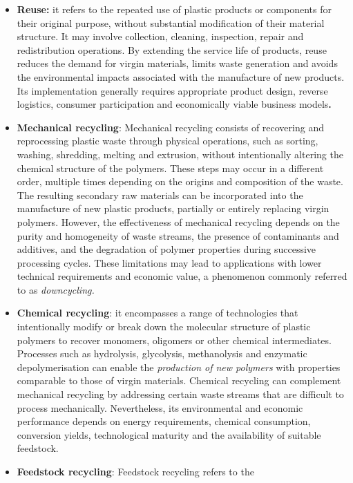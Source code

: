 \documentclass[
  12pt,
  oneside]{book}
\providecommand{\tightlist}{%
  \setlength{\itemsep}{0pt}\setlength{\parskip}{0pt}}
\begin{document}
\begin{itemize}
\tightlist
\item
  \textbf{Reuse:} it refers to the repeated use of plastic products or
  components for their original purpose, without substantial
  modification of their material structure. It may involve collection,
  cleaning, inspection, repair and redistribution operations. By
  extending the service life of products, reuse reduces the demand for
  virgin materials, limits waste generation and avoids the environmental
  impacts associated with the manufacture of new products. Its
  implementation generally requires appropriate product design, reverse
  logistics, consumer participation and economically viable business
  models\textbf{.}
\item
  \textbf{Mechanical recycling}: Mechanical recycling consists of
  recovering and reprocessing plastic waste through physical operations,
  such as sorting, washing, shredding, melting and extrusion, without
  intentionally altering the chemical structure of the polymers. These
  steps may occur in a different order, multiple times depending on the
  origins and composition of the waste. The resulting secondary raw
  materials can be incorporated into the manufacture of new plastic
  products, partially or entirely replacing virgin polymers. However,
  the effectiveness of mechanical recycling depends on the purity and
  homogeneity of waste streams, the presence of contaminants and
  additives, and the degradation of polymer properties during successive
  processing cycles. These limitations may lead to applications with
  lower technical requirements and economic value, a phenomenon commonly
  referred to as \emph{downcycling.}
\item
  \textbf{Chemical recycling}: it encompasses a range of technologies
  that intentionally modify or break down the molecular structure of
  plastic polymers to recover monomers, oligomers or other chemical
  intermediates. Processes such as hydrolysis, glycolysis, methanolysis
  and enzymatic depolymerisation can enable the \emph{production of new
  polymers} with properties comparable to those of virgin materials.
  Chemical recycling can complement mechanical recycling by addressing
  certain waste streams that are difficult to process mechanically.
  Nevertheless, its environmental and economic performance depends on
  energy requirements, chemical consumption, conversion yields,
  technological maturity and the availability of suitable feedstock.
\item
  \textbf{Feedstock recycling}: Feedstock recycling refers to the

\end{itemize}
\end{document}
